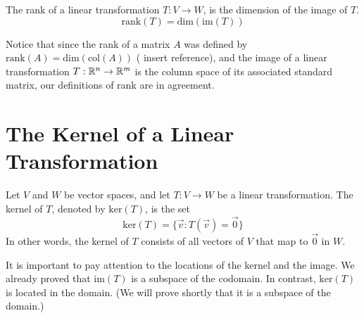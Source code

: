 \documentclass{ximera}
\begin{document}
\begin{definition}\label{def:rankofT}
The rank of a linear transformation $T:V\rightarrow W$, is the dimension of the image of $T$.
$$\text{rank}(T)=\text{dim}(\text{im}(T))$$
\end{definition}

Notice that since the rank of a matrix $A$ was defined by $\text{rank}(A) = \text{dim}(\text{col}(A))$ ({\color{red} insert reference}), and the image of a linear transformation $T:\mathbb{R}^n\rightarrow \mathbb{R}^m$ is the column space of its associated standard matrix, our definitions of rank are in agreement.

\section*{The Kernel of a Linear Transformation}

\begin{definition}
Let $V$ and $W$ be vector spaces, and let $T:V\rightarrow W$ be a linear transformation.  The kernel of $T$, denoted by $\text{ker}(T)$, is the set
$$\text{ker}(T)=\{\vec{v}:T(\vec{v})=\vec{0}\}$$
In other words, the kernel of $T$ consists of all vectors of $V$ that map to $\vec{0}$ in $W$.
\end{definition}
It is important to pay attention to the locations of the kernel and the image.  We already proved that $\text{im}(T)$ is a subspace of the codomain.  In contrast, $\text{ker}(T)$ is located in the domain.  (We will prove shortly that it is a subspace of the domain.)

\begin{image}
\end{image}
\end{document}
